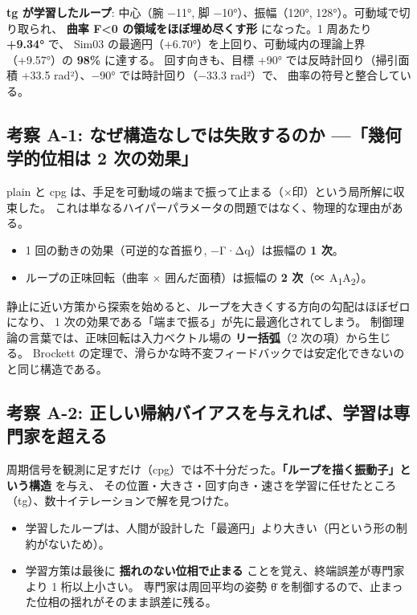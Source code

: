 \textbf{tg が学習したループ}: 中心（腕 −11°, 脚 −10°）、振幅（120°, 128°）。可動域で切り取られ、 \textbf{曲率 F\textless0 の領域をほぼ埋め尽くす形} になった。1 周あたり \textbf{+9.34°} で、 Sim03 の最適円（+6.70°）を上回り、可動域内の理論上界（+9.57°）の \textbf{98\%} に達する。 回す向きも、目標 +90° では反時計回り（掃引面積 +33.5 rad²）、−90° では時計回り（−33.3 rad²）で、 曲率の符号と整合している。

\subsection{考察 A-1: なぜ構造なしでは失敗するのか ---「幾何学的位相は 2 次の効果」}

plain と cpg は、手足を可動域の端まで振って止まる（×印）という局所解に収束した。 これは単なるハイパーパラメータの問題ではなく、物理的な理由がある。

\begin{itemize}
\tightlist
\item
  1 回の動きの効果（可逆的な首振り, −Γ·Δq）は振幅の \textbf{1 次}。
\item
  ループの正味回転（曲率 × 囲んだ面積）は振幅の \textbf{2 次}（∝ A\textsubscript{1}A\textsubscript{2}）。
\end{itemize}

静止に近い方策から探索を始めると、ループを大きくする方向の勾配はほぼゼロになり、 1 次の効果である「端まで振る」が先に最適化されてしまう。 制御理論の言葉では、正味回転は入力ベクトル場の \textbf{リー括弧}（2 次の項）から生じる。 Brockett の定理で、滑らかな時不変フィードバックでは安定化できないのと同じ構造である。

\subsection{考察 A-2: 正しい帰納バイアスを与えれば、学習は専門家を超える}

周期信号を観測に足すだけ（cpg）では不十分だった。\textbf{「ループを描く振動子」という構造} を与え、 その位置・大きさ・回す向き・速さを学習に任せたところ（tg）、数十イテレーションで解を見つけた。

\begin{itemize}
\tightlist
\item
  学習したループは、人間が設計した「最適円」より大きい（円という形の制約がないため）。
\item
  学習方策は最後に \textbf{揺れのない位相で止まる} ことを覚え、終端誤差が専門家より 1 桁以上小さい。 専門家は周回平均の姿勢 θ̄ を制御するので、止まった位相の揺れがそのまま誤差に残る。
\end{itemize}

